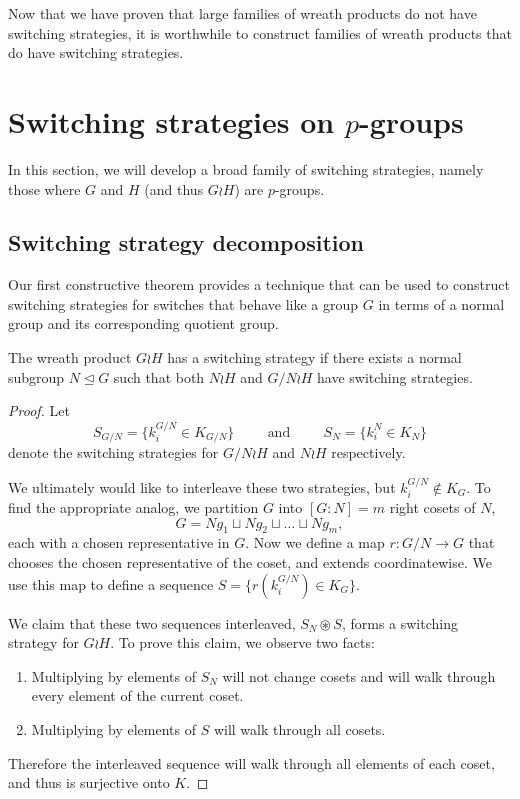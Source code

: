 Now that we have proven that large families of wreath products do not have
switching strategies, it is worthwhile to construct families of wreath products
that do have switching strategies.
%
%
\section{Switching strategies on \texorpdfstring{$p$}{p}-groups}
\label{sec:pGroupStrategy}
In this section, we will develop a broad family of switching strategies,
namely those where $G$ and $H$ (and thus $G \wr H$) are $p$-groups.
\subsection{Switching strategy decomposition}

Our first constructive theorem provides a technique that can be used to
construct switching strategies for switches that behave like a group $G$ in
terms of a normal group and its corresponding quotient group.
\begin{theorem}
  The wreath product $G \wr H$ has a switching strategy if there exists a
  normal subgroup $N \trianglelefteq G$ such that both $N \wr H$ and
  $G/N \wr H$ have switching strategies.
\label{thm:switchingStrategyDecomposition}
\end{theorem}
\begin{proof}
  Let \[
    S_{G/N} = \{k_i^{G/N} \in K_{G/N}\}
    \hspace{1cm}\text{and}\hspace{1cm}
    S_{N} = \{k_i^N \in K_{N}\}
  \] denote the switching strategies for ${G/N \wr H}$ and ${N \wr H}$
  respectively.

  We ultimately would like to interleave these two strategies,
  but $k_i^{G/N} \not\in K_G$. To find the appropriate analog,
  we partition $G$ into $[G : N] = m$ right cosets of $N$, \begin{equation}
    G = Ng_1 \sqcup Ng_2 \sqcup \dots \sqcup Ng_m,
  \end{equation} each with a chosen representative in $G$.
  Now we define a map $r \colon G/N \rightarrow G$ that chooses the chosen
  representative of the coset, and extends coordinatewise. We use this map to
  define a sequence $S = \{r(k_i^{G/N}) \in K_G\}$.

  We claim that these two sequences interleaved, $S_N \circledast S$, forms a
  switching strategy for $G \wr H$. To prove this claim, we observe two facts:
  \begin{enumerate}
    \item Multiplying by elements of $S_N$ will not change cosets and will walk
    through every element of the current coset.
    \item Multiplying by elements of $S$ will walk through all cosets.
  \end{enumerate}
  Therefore the interleaved sequence will walk through all elements of each
  coset, and thus is surjective onto $K$.
\end{proof}

